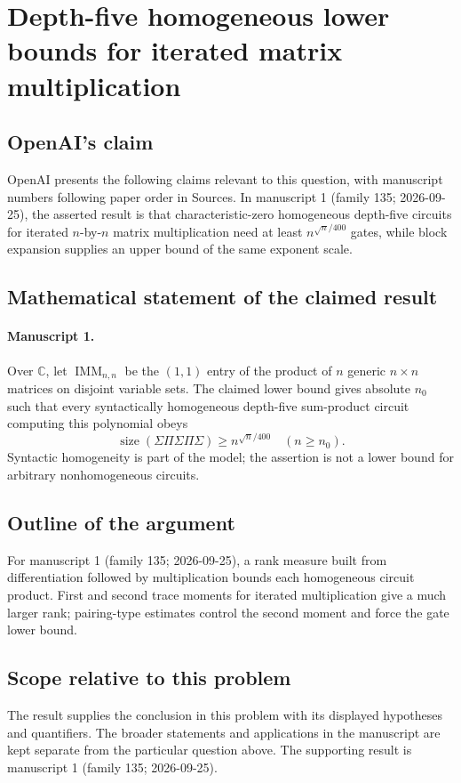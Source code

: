 \documentclass[11pt]{article}
\begin{document}
\section*{Depth-five homogeneous lower bounds for iterated matrix multiplication}

\subsection{OpenAI's claim}
OpenAI presents the following claims relevant to this question, with manuscript numbers following paper order in Sources. In manuscript 1 (family 135; 2026-09-25), the asserted result is that characteristic-zero homogeneous depth-five circuits for iterated $n$-by-$n$ matrix multiplication need at least $n^{\sqrt n/400}$ gates, while block expansion supplies an upper bound of the same exponent scale.

\subsection{Mathematical statement of the claimed result}
\paragraph{Manuscript 1.}
Over $\mathbb C$, let $\operatorname{IMM}_{n,n}$ be the $(1,1)$ entry of the product of $n$ generic $n\times n$ matrices on disjoint variable sets. The claimed lower bound gives absolute $n_0$ such that every syntactically homogeneous depth-five sum-product circuit computing this polynomial obeys
\[
 \operatorname{size}(\Sigma\Pi\Sigma\Pi\Sigma)\ge n^{\sqrt n/400}\quad(n\ge n_0).
\]
Syntactic homogeneity is part of the model; the assertion is not a lower bound for arbitrary nonhomogeneous circuits.

\subsection{Outline of the argument}
For manuscript 1 (family 135; 2026-09-25), a rank measure built from differentiation followed by multiplication bounds each homogeneous circuit product. First and second trace moments for iterated multiplication give a much larger rank; pairing-type estimates control the second moment and force the gate lower bound.

\subsection{Scope relative to this problem}
The result supplies the conclusion in this problem with its displayed hypotheses and quantifiers. The broader statements and applications in the manuscript are kept separate from the particular question above. The supporting result is manuscript 1 (family 135; 2026-09-25).
\end{document}
